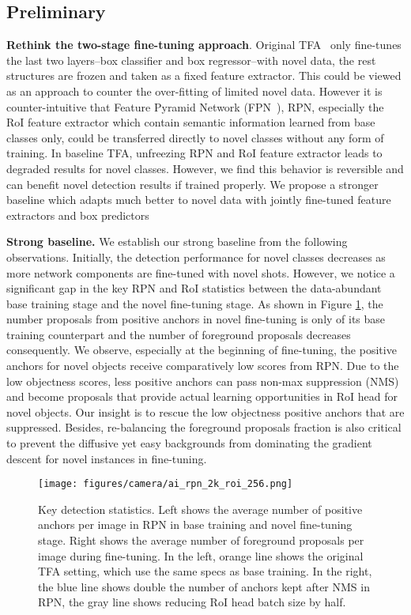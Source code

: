 \documentclass[final]{cvpr}
\begin{document}
\subsection{Preliminary}

\textbf{Rethink the two-stage fine-tuning approach}. Original TFA~\cite{wang_frustratingly_2020} only fine-tunes the last two  layers--box classifier and box regressor--with novel data, the rest structures are frozen and taken as a fixed feature extractor. This could be viewed as an approach to counter the over-fitting of limited novel data. However it is counter-intuitive that Feature Pyramid Network (FPN~\cite{lin_feature_2017}), RPN, especially the RoI feature extractor which contain semantic information learned from base classes only, could be transferred directly to novel classes without any form of training.  In baseline TFA, unfreezing RPN and RoI feature extractor leads to degraded results for novel classes. However, we find this behavior is reversible and can  benefit novel detection results if trained properly. We propose a stronger baseline which adapts much better to novel data with jointly fine-tuned feature extractors and box predictors 

\textbf{Strong baseline.} We establish our strong baseline from the following observations. Initially, the detection performance for novel classes decreases as more network components are fine-tuned with novel shots. However, we notice a significant gap in the key RPN and RoI statistics between the data-abundant base training stage and the novel fine-tuning stage. As shown in Figure \ref{fig:rpn-roi}, the number proposals from positive anchors in novel fine-tuning is only  of its base training counterpart and the number of foreground proposals decreases consequently. We observe, especially at the beginning of fine-tuning, the positive anchors for novel objects receive comparatively low scores from RPN. Due to the low objectness scores, less positive anchors can pass non-max suppression (NMS) and become proposals that provide actual learning opportunities in RoI head for novel objects. Our insight is to rescue the low objectness positive anchors that are suppressed. Besides, re-balancing the foreground proposals fraction is also critical to prevent the diffusive yet easy backgrounds from dominating the gradient descent for novel instances in fine-tuning. 


\begin{figure}[t]
\begin{center}
\texttt{[image: figures/camera/ai\_rpn\_2k\_roi\_256.png]}
\end{center}
\vspace{-2.5mm}
\caption{Key detection statistics. Left shows the average number of positive anchors per image in RPN in base training and novel fine-tuning stage. Right shows the average number of foreground proposals per image during fine-tuning. In the left, orange line shows the original TFA setting, which use the same specs as base training. In the right, the blue line shows double the number of anchors kept after NMS in RPN, the gray line shows reducing RoI head batch size by half.} 
\label{fig:rpn-roi}
\end{figure}
\end{document}
